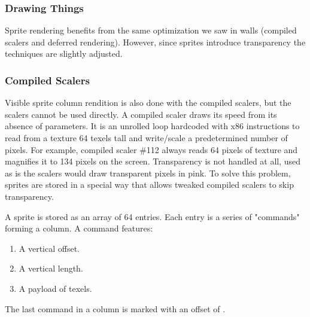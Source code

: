 \subsubsection{Drawing Things}
Sprite rendering benefits from the same optimization we saw in walls (compiled scalers and deferred rendering). However, since sprites introduce transparency the techniques are slightly adjusted.

\subsubsection{Compiled Scalers}
Visible sprite column rendition is also done with the compiled scalers, but the scalers cannot be used directly. A compiled scaler draws its speed from its absence of parameters. It is an unrolled loop hardcoded with x86 instructions to read from a texture 64 texels tall and write/scale a predetermined number of pixels. For example, compiled scaler \#112 always reads 64 pixels of texture and magnifies it to 134 pixels on the screen. Transparency is not handled at all, used as is the scalers would draw transparent pixels in pink. To solve this problem, sprites are stored in a special way that allows tweaked compiled scalers to skip transparency.\\
\par
A sprite is stored as an array of 64 entries. Each entry is a series of "commands" forming a column. A command features:
\begin{enumerate}
 \item A vertical offset.
 \item A vertical length.
 \item A payload of texels.
 \end{enumerate}
\par
The last command in a column is marked with an offset of .\\
\par

